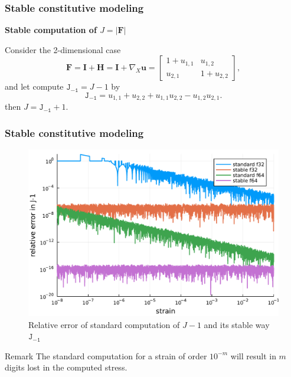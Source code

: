 \documentclass{beamer}
\newcommand{\bm}{\boldsymbol}
\newcommand\Det[1]{\lvert #1 \rvert}
\newcommand\Jm{\mathtt{J_{-1}}}
\begin{document}
\begin{frame}
	\frametitle{Stable constitutive modeling}
	\textbf{Stable computation of $J=\Det{\bm F}$}
	
	\vspace{10mm}
	Consider the 2-dimensional case
	$$
	\bm F = \bm I + \bm H = \bm I + \nabla_X \bm{u} = \begin{bmatrix}
		1 + u_{1,1} & u_{1,2} \\
		u_{2,1} & 1 + u_{2,2}
	\end{bmatrix},
	$$
	and let compute $\Jm = J-1$ by
	\begin{equation}\label{eq:Jm1}
		\Jm = u_{1,1} + u_{2,2} + u_{1,1} u_{2,2} - u_{1,2} u_{2,1}. \nonumber
	\end{equation}
	then $J = \Jm + 1$.
\end{frame}

\begin{frame}
	\frametitle{Stable constitutive modeling}
	\begin{figure}
		\centering
		\includegraphics[width=.6\linewidth]{../figs/Jm1.pdf}
		\caption{Relative error of standard computation of $J-1$ and its stable way $\Jm$} \label{fig1:Jm1}
	\end{figure}
	
	\begin{block}{Remark}
		The standard computation for a strain of order \alert{$10^{-m}$} will result in \alert{$m$} digits lost in the computed stress.
	\end{block}
\end{frame}
\end{document}
